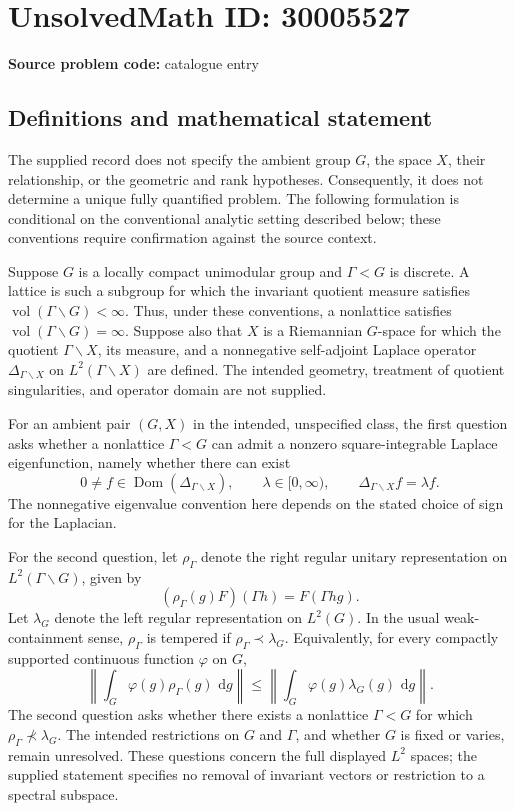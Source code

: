 \documentclass[11pt]{article}
\newcommand{\dd}{\,\mathrm{d}}
\begin{document}
\section*{UnsolvedMath ID: 30005527}
\textbf{Source problem code:} catalogue entry
\subsection{Definitions and mathematical statement}
The supplied record does not specify the ambient group \(G\), the space \(X\), their relationship, or the geometric and rank hypotheses. Consequently, it does not determine a unique fully quantified problem. The following formulation is conditional on the conventional analytic setting described below; these conventions require confirmation against the source context.

Suppose \(G\) is a locally compact unimodular group and \(\Gamma<G\) is discrete. A lattice is such a subgroup for which the invariant quotient measure satisfies \(\operatorname{vol}(\Gamma\backslash G)<\infty\). Thus, under these conventions, a nonlattice satisfies \(\operatorname{vol}(\Gamma\backslash G)=\infty\). Suppose also that \(X\) is a Riemannian \(G\)-space for which the quotient \(\Gamma\backslash X\), its measure, and a nonnegative self-adjoint Laplace operator \(\Delta_{\Gamma\backslash X}\) on \(L^2(\Gamma\backslash X)\) are defined. The intended geometry, treatment of quotient singularities, and operator domain are not supplied.

For an ambient pair \((G,X)\) in the intended, unspecified class, the first question asks whether a nonlattice \(\Gamma<G\) can admit a nonzero square-integrable Laplace eigenfunction, namely whether there can exist
\[
0\ne f\in\operatorname{Dom}(\Delta_{\Gamma\backslash X}),\qquad \lambda\in[0,\infty),\qquad
\Delta_{\Gamma\backslash X}f=\lambda f.
\]
The nonnegative eigenvalue convention here depends on the stated choice of sign for the Laplacian.

For the second question, let \(\rho_\Gamma\) denote the right regular unitary representation on \(L^2(\Gamma\backslash G)\), given by
\[
(\rho_\Gamma(g)F)(\Gamma h)=F(\Gamma h g).
\]
Let \(\lambda_G\) denote the left regular representation on \(L^2(G)\). In the usual weak-containment sense, \(\rho_\Gamma\) is tempered if \(\rho_\Gamma\prec\lambda_G\). Equivalently, for every compactly supported continuous function \(\varphi\) on \(G\),
\[
\left\|\int_G\varphi(g)\rho_\Gamma(g)\,\dd g\right\|
\le
\left\|\int_G\varphi(g)\lambda_G(g)\,\dd g\right\|.
\]
The second question asks whether there exists a nonlattice \(\Gamma<G\) for which \(\rho_\Gamma\not\prec\lambda_G\). The intended restrictions on \(G\) and \(\Gamma\), and whether \(G\) is fixed or varies, remain unresolved. These questions concern the full displayed \(L^2\) spaces; the supplied statement specifies no removal of invariant vectors or restriction to a spectral subspace.
\end{document}
